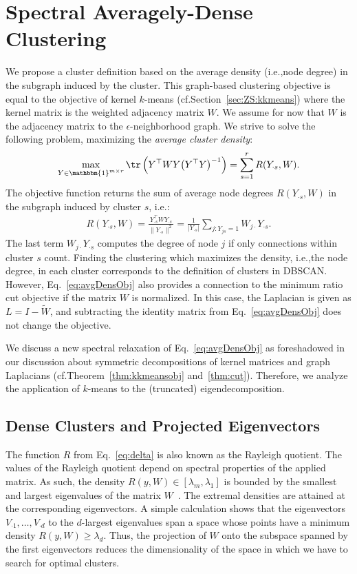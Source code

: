 \section{Spectral Averagely-Dense Clustering}
We propose a cluster definition based on the average density (i.e.,\@ node degree) in the subgraph induced by the cluster. This graph-based clustering objective is equal to the objective of kernel $k$-means (cf.\@ Section~\ref{sec:ZS:kkmeans}) where the kernel matrix is the weighted adjacency matrix $W$. We assume for now that $W$ is the adjacency matrix to the $\epsilon$-neighborhood graph. We strive to solve the following problem, maximizing the \emph{average cluster density}:
\begin{align}\label{eq:avgDensObj}
\max_{Y\in \mathbbm{1}^{m\times r}}\tr\left(Y^\top WY \bigl(Y^\top Y\bigr)^{-1}\right)=\sum_{s=1}^r R(Y_{\cdot s},W).
\end{align}
The objective function returns the sum of average node degrees $R(Y_{\cdot s},W)$ in the subgraph induced by cluster $s$, i.e.:
\begin{align}\label{eq:delta}
R(Y_{\cdot s},W) = \frac{Y_{\cdot s}^\top W Y_{\cdot s}}{\lVert Y_{\cdot s}\rVert ^2} =\frac{1}{\lvert Y_{\cdot s}\rvert }\sum_{j:Y_{js}=1} W_{j\cdot}Y_{\cdot s}.
\end{align}  
The last term $W_{j\cdot}Y_{\cdot s}$ computes the degree of node $j$ if only connections within cluster $s$ count. Finding the clustering which maximizes the density, i.e.,\@ the node degree, in each cluster corresponds to the definition of clusters in DBSCAN. However, Eq.~\eqref{eq:avgDensObj} also provides a connection to the minimum ratio cut objective if the matrix $W$ is normalized. In this case, the Laplacian is given as $L=I-\tilde{W}$, and subtracting the identity matrix from Eq.~\eqref{eq:avgDensObj} does not change the objective.

We discuss a new spectral relaxation of Eq.~\eqref{eq:avgDensObj} as foreshadowed in our discussion about symmetric decompositions of kernel matrices and graph Laplacians (cf.\@ Theorem~\ref{thm:kkmeansobj} and~\ref{thm:cut}). Therefore, we analyze the application of $k$-means to the (truncated) eigendecomposition. 
\subsection{Dense Clusters and Projected Eigenvectors}
The function $R$ from Eq.~\eqref{eq:delta} is also known as the Rayleigh quotient. The values of the Rayleigh quotient 
depend on spectral properties of the applied matrix. As such, the density $R(y,W)\in [\lambda_m,\lambda_1]$ is bounded by the smallest and largest eigenvalues of the matrix $W$~\citep{collatz1978spektren}. The extremal densities are attained at the corresponding eigenvectors. A simple calculation shows that the eigenvectors $V_{\cdot 1},\ldots,V_{\cdot d}$ to the $d$-largest eigenvalues span a space whose points have a minimum density $R(y,W)\geq\lambda_d$. 
Thus, the projection of $W$ onto the subspace spanned by the first eigenvectors reduces the dimensionality of the space in which we have to search for optimal clusters.

